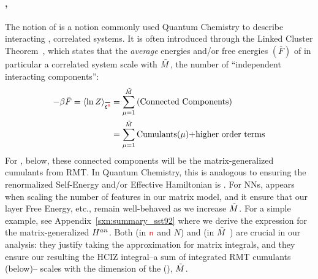 \paragraph{\SizeConsistency,}  
The notion of \emph{\SizeConsistency} is a notion commonly 
used Quantum Chemistry to describe interacting , correlated systems. It is often introduced through the Linked Cluster Theorem~\cite{Hubbard1959,Brandow1963},
which states that the \emph{average} energies and/or free energies $(\bar{F})$ of in particular a correlated system scale with $\tilde{M}$,
the number of ``independent interacting components'':
\begin{align}
  \label{eqn:LCT}
  -\beta \bar{F}=\langle \ln Z \rangle_{\AVGNDXIn} &= \sum_{\mu=1}^{\MECS}\text{(Connected Components)} \\ \nonumber
  &= \sum_{\mu=1}^{\MECS}\text{Cumulants($\mu$)+higher order terms} 
\end{align}
For \SETOL, below, these connected components will be the matrix-generalized cumulants from RMT.
In Quantum Chemistry, this is analogous to ensuring the renormalized Self-Energy and/or Effective Hamiltonian is \SizeConsistent.
For NNs, \SizeConsistency appears when scaling the number of features in our matrix model,
and it ensure that our layer Free Energy, etc.,  remain well-behaved as we increase $\tilde{M}$.
For a simple example, see Appendix~\ref{sxn:summary_sst92}
 where we derive the expression for the matrix-generalized
\AnnealedHamiltonian $H^{an}$.  
Both \SizeExtensivity (in ${\color{red}\sf{n}}$ and $N$) and \SizeConsistency (in $\tilde{M}$ )
are crucial in our \SETOL analysis:  they justify taking the \LargeN approximation for matrix integrals, and they ensure
our resulting the HCIZ integral--a sum of integrated RMT cumulants (below)--
scales with the dimension of the \EffectiveCorrelationSpace (\ECS), $\tilde{M}$.  


